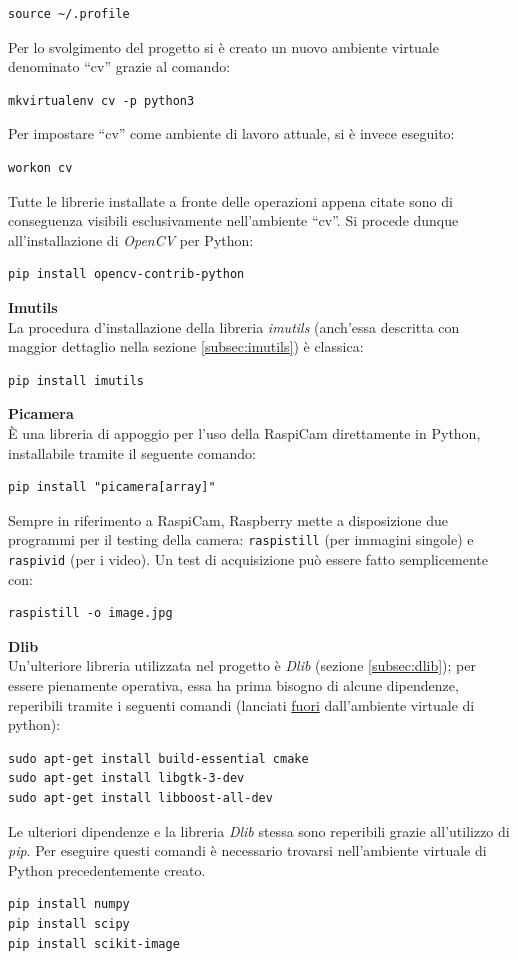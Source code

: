 \documentclass[12pt]{article}
\newcommand{\quotes}[1]{``#1''}
\begin{document}
\begin{lstlisting}
source ~/.profile
\end{lstlisting}
Per lo svolgimento del progetto si è creato un nuovo ambiente virtuale denominato \quotes{cv} grazie al comando:
\begin{lstlisting}
mkvirtualenv cv -p python3
\end{lstlisting}
Per impostare \quotes{cv} come ambiente di lavoro attuale, si è invece eseguito:
\begin{lstlisting}
workon cv
\end{lstlisting}
Tutte le librerie installate a fronte delle operazioni appena citate sono di conseguenza visibili esclusivamente nell'ambiente \quotes{cv}. Si procede dunque all'installazione di \textit{OpenCV} per Python:
\begin{lstlisting}
pip install opencv-contrib-python
\end{lstlisting}

\vspace{0.5cm}
\textbf{Imutils}\\
La procedura d'installazione della libreria \textit{imutils} (anch'essa descritta con maggior dettaglio nella sezione \ref{subsec:imutils}) è classica:
\begin{lstlisting}
pip install imutils
\end{lstlisting}

\vspace{0.5cm}
\textbf{Picamera}\\
È una libreria di appoggio per l'uso della RaspiCam direttamente in Python, installabile tramite il seguente comando:
\begin{lstlisting}
pip install "picamera[array]"
\end{lstlisting}
Sempre in riferimento a RaspiCam, Raspberry mette a disposizione due programmi per il testing della camera: \texttt{raspistill} (per immagini singole) e \texttt{raspivid} (per i video). Un test di acquisizione può essere fatto semplicemente con:
\begin{lstlisting}
raspistill -o image.jpg
\end{lstlisting}

\vspace{0.5cm}
\textbf{Dlib}\\
Un'ulteriore libreria utilizzata nel progetto è \textit{Dlib} (sezione \ref{subsec:dlib}); per essere pienamente operativa, essa ha prima bisogno di alcune dipendenze, reperibili tramite i seguenti comandi (lanciati \underline{fuori} dall'ambiente virtuale di python):
\begin{lstlisting}
sudo apt-get install build-essential cmake
sudo apt-get install libgtk-3-dev
sudo apt-get install libboost-all-dev
\end{lstlisting}
Le ulteriori dipendenze e la libreria \textit{Dlib} stessa sono reperibili grazie all'utilizzo di \textit{pip}. Per eseguire questi comandi è necessario trovarsi nell'ambiente virtuale di Python precedentemente creato.
\begin{lstlisting}
pip install numpy
pip install scipy
pip install scikit-image
\end{lstlisting}
\end{document}
